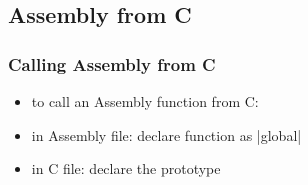 \documentclass[dvipsnames]{beamer}
\begin{document}
%
%
%
%
%
%
%
%

\subsection{Assembly from C}

\begin{frame}
  \frametitle{Calling Assembly from C}

  \begin{itemize}
    \item to call an Assembly function from C:

    \medskip
    \item in Assembly file: declare function as |global|
    \item in C file: declare the prototype
  \end{itemize}
\end{frame}
\end{document}
